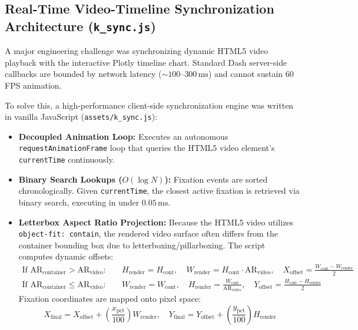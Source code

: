 \documentclass[11pt,a4paper]{article}
\begin{document}
\subsection{Real-Time Video-Timeline Synchronization Architecture (\texttt{k\_sync.js})}
A major engineering challenge was synchronizing dynamic HTML5 video playback with the interactive Plotly timeline chart. Standard Dash server-side callbacks are bounded by network latency ($\sim 100\text{--}300\,\text{ms}$) and cannot sustain 60 FPS animation.

To solve this, a high-performance client-side synchronization engine was written in vanilla JavaScript (\texttt{assets/k\_sync.js}):
\begin{itemize}
    \item \textbf{Decoupled Animation Loop:} Executes an autonomous \texttt{requestAnimationFrame} loop that queries the HTML5 video element's \texttt{currentTime} continuously.
    \item \textbf{Binary Search Lookups ($O(\log N)$):} Fixation events are sorted chronologically. Given \texttt{currentTime}, the closest active fixation is retrieved via binary search, executing in under $0.05\,\text{ms}$.
    \item \textbf{Letterbox Aspect Ratio Projection:} Because the HTML5 video utilizes \texttt{object-fit: contain}, the rendered video surface often differs from the container bounding box due to letterboxing/pillarboxing. The script computes dynamic offsets:
    \begin{align}
        \text{If } \text{AR}_{\text{container}} > \text{AR}_{\text{video}}: & \quad H_{\text{render}} = H_{\text{cont}}, \quad W_{\text{render}} = H_{\text{cont}} \cdot \text{AR}_{\text{video}}, \quad X_{\text{offset}} = \frac{W_{\text{cont}} - W_{\text{render}}}{2} \\
        \text{If } \text{AR}_{\text{container}} \le \text{AR}_{\text{video}}: & \quad W_{\text{render}} = W_{\text{cont}}, \quad H_{\text{render}} = \frac{W_{\text{cont}}}{\text{AR}_{\text{video}}}, \quad Y_{\text{offset}} = \frac{H_{\text{cont}} - H_{\text{render}}}{2}
    \end{align}
    Fixation coordinates are mapped onto pixel space:
    \begin{equation}
        X_{\text{final}} = X_{\text{offset}} + \left(\frac{x_{\text{pct}}}{100}\right) W_{\text{render}}, \quad Y_{\text{final}} = Y_{\text{offset}} + \left(\frac{y_{\text{pct}}}{100}\right) H_{\text{render}}
    \end{equation}

\end{itemize}
\end{document}
